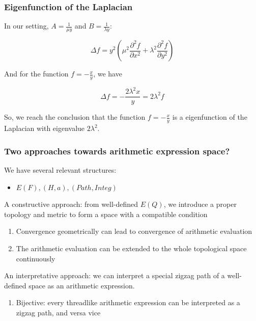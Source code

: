 \documentclass[aspectratio=169]{beamer}
\begin{document}
\begin{frame}
    \frametitle{Eigenfunction of the Laplacian}
    In our setting, \(A = \frac{1}{\mu y}\) and \(B = \frac{1}{\lambda y}\):

    \[
        \Delta f = y^2 \left(\mu^2 \frac{\partial^2 f}{\partial x^2} + \lambda^2 \frac{\partial^2 f}{\partial y^2}\right)
    \]

    And for the function \(f = - \frac{x}{y}\), we have

    \[
        \Delta f = - \frac{2 \lambda^2 x}{y} = 2 \lambda^2 f
    \]

    So, we reach the conclusion that the function \(f = - \frac{x}{y}\) is a eigenfunction of the Laplacian with eigenvalue \(2 \lambda^2\).
\end{frame}

\begin{frame}
    \frametitle{Two approaches towards arithmetic expression space?}
    We have several relevant structures:
    \begin{itemize}
        \item $E(F), (H, a), (Path, Integ)$
    \end{itemize}
    A constructive approach: from well-defined $E(Q)$, we introduce a proper topology and metric to form a space with
    a compatible condition
    \begin{enumerate}
        \item Convergence geometrically can lead to convergence of arithmetic evaluation
        \item The arithmetic evaluation can be extended to the whole topological space continuously
    \end{enumerate}
    An interpretative approach: we can interpret a special zigzag path of a well-defined space as an arithmetic
    expression.
    \begin{enumerate}
        \item Bijective: every threadlike arithmetic expression can be interpreted as a zigzag path, and versa vice
    \end{enumerate}
\end{frame}
\end{document}
